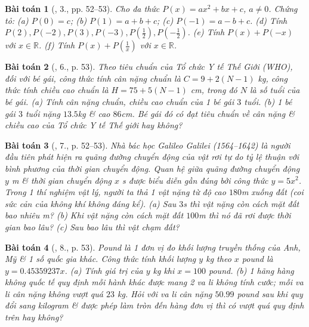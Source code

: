 \documentclass{article}
\newtheorem{baitoan}{Bài toán}
\begin{document}
\begin{baitoan}[\cite{SGK_Toan_7_Canh_Dieu_tap_2}, 3., pp. 52--53]
	Cho đa thức $P(x) = ax^2 + bx + c$, $a\ne0$. Chứng tỏ: (a) $P(0) = c$; (b) $P(1) = a + b + c$; (c) $P(-1) = a - b + c$. (d) Tính $P(2),P(-2),P(3),P(-3),P\left(\frac{1}{2}\right),P\left(-\frac{1}{2}\right)$. (e) Tính $P(x) + P(-x)$ với $x\in\mathbb{R}$. (f) Tính $P(x) + P\left(\frac{1}{x}\right)$ với $x\in\mathbb{R}$.
\end{baitoan}

\begin{baitoan}[\cite{SGK_Toan_7_Canh_Dieu_tap_2}, 6., p. 53]
	Theo tiêu chuẩn của Tổ chức Y tế Thế Giới (WHO), đối với bé gái, công thức tính cân nặng chuẩn là $C = 9 + 2(N - 1)$ \emph{kg}, công thức tính chiều cao chuẩn là $H = 75 + 5(N - 1)$ \emph{cm}, trong đó $N$ là số tuổi của bé gái. (a) Tính cân nặng chuẩn, chiều cao chuẩn của 1 bé gái $3$ tuổi. (b) 1 bé gái $3$ tuổi nặng $13.5$\emph{kg} \& cao $86$\emph{cm}. Bé gái đó có đạt tiêu chuẩn về cân nặng \& chiều cao của Tổ chức Y tế Thế giới hay không?
\end{baitoan}

\begin{baitoan}[\cite{SGK_Toan_7_Canh_Dieu_tap_2}, 7., p. 52--53]
	Nhà bác học Galileo Galilei (1564--1642) là người đầu tiên phát hiện ra quãng đường chuyển động của vật rơi tự do tỷ lệ thuận với bình phương của thời gian chuyển động. Quan hệ giữa quãng đường chuyển động $y$ \emph{m} \& thời gian chuyển động $x$ \emph{s} được biểu diễn gần đúng bởi công thức $y = 5x^2$. Trong 1 thí nghiệm vật lý, người ta thả 1 vật nặng từ độ cao $180$\emph{m} xuống đất (coi sức cản của không khí không đáng kể). (a) Sau $3$\emph{s} thì vật nặng còn cách mặt đất bao nhiêu \emph{m}? (b) Khi vật nặng còn cách mặt đất $100$\emph{m} thì nó đã rơi được thời gian bao lâu? (c) Sau bao lâu thì vật chạm đất?
\end{baitoan}

\begin{baitoan}[\cite{SGK_Toan_7_Canh_Dieu_tap_2}, 8., p. 53]
	Pound là 1 đơn vị đo khối lượng truyền thống của Anh, Mỹ \& 1 số quốc gia khác. Công thức tính khối lượng $y$ \emph{kg} theo $x$ pound là $y = 0.45359237x$. (a) Tính giá trị của $y$ \emph{kg} khi $x = 100$ pound. (b) 1 hãng hàng không quốc tế quy định mỗi hành khác được mang 2 va li không tính cước; mỗi va li cân nặng không vượt quá $23$ \emph{kg}. Hỏi với va li cân nặng $50.99$ pound sau khi quy đổi sang kilogram \& được phép làm tròn đến hàng đơn vị thì có vượt quá quy định trên hay không?
\end{baitoan}
\end{document}
